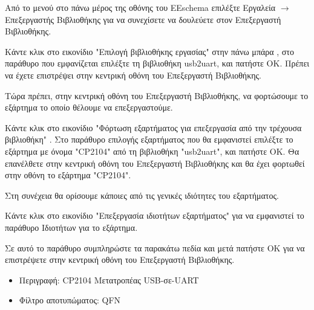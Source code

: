 \documentclass[a4paper]{article}
\begin{document}
Από το μενού στο πάνω μέρος της οθόνης του \textenglish{EEschema} επιλέξτε Εργαλεία $\rightarrow$ Επεξεργαστής Βιβλιοθήκης για να συνεχίσετε να δουλεύετε στον Επεξεργαστή Βιβλιοθήκης.

Κάντε κλικ στο εικονίδιο "Επιλογή βιβλιοθήκης εργασίας" στην πάνω μπάρα %
, στο παράθυρο που εμφανίζεται επιλέξτε τη βιβλιοθήκη usb2uart, και πατήστε ΟΚ. Πρέπει να έχετε επιστρέψει στην κεντρική οθόνη του Επεξεργαστή Βιβλιοθήκης.

\begin{figure}
  \begin{center}
    \label{fig:kicad-main}
  \end{center}
\end{figure}

Τώρα πρέπει, στην κεντρική οθόνη του Επεξεργαστή Βιβλιοθήκης, να φορτώσουμε το εξάρτημα το οποίο θέλουμε να επεξεργαστούμε. 

Κάντε κλικ στο εικονίδιο "Φόρτωση εξαρτήματος για επεξεργασία από την τρέχουσα βιβλιοθήκη" %
. Στο παράθυρο επιλογής εξαρτήματος που θα εμφανιστεί επιλέξτε το εξάρτημα με όνομα "\textenglish{CP2104}" από τη βιβλιοθήκη "usb2uart", και πατήστε ΟΚ. Θα επανέλθετε στην κεντρική οθόνη του Επεξεργαστή Βιβλιοθήκης και θα έχει φορτωθεί στην οθόνη το εξάρτημα "\textenglish{CP2104}".

Στη συνέχεια θα ορίσουμε κάποιες από τις γενικές ιδιότητες του εξαρτήματος. 

Κάντε κλικ στο εικονίδιο "Επεξεργασία ιδιοτήτων εξαρτήματος" %
για να εμφανιστεί το παράθυρο Ιδιοτήτων για το εξάρτημα. 

\begin{figure}
  \begin{center}
    \label{fig:kicad-main}
  \end{center}
\end{figure}

Σε αυτό το παράθυρο συμπληρώστε τα παρακάτω πεδία και μετά πατήστε ΟΚ για να επιστρέψετε στην κεντρική οθόνη του Επεξεργαστή Βιβλιοθήκης.

\begin{itemize}
    \item Περιγραφή: \textenglish{CP2104} Μετατροπέας USB-σε-UART
    \item Φίλτρο αποτυπώματος: QFN
\end{itemize}
\end{document}
